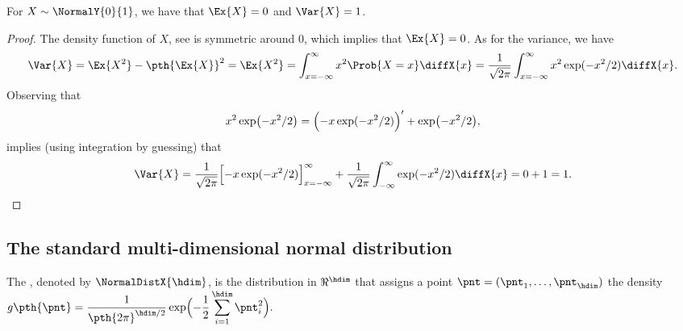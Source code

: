 \begin{lemma}
    For $X \sim \NormalY{0}{1}$, we have that $\Ex{X} = 0$ and
    $\Var{X} = 1$.
\end{lemma}
\begin{proof}
    The density function of $X$, see  is symmetric
    around $0$, which implies that $\Ex{X} =0$. As for the variance,
    we have
    \begin{equation*}
        \Var{X}%
        =%
        \Ex{X^2} - \pth{\Ex{X}}^2%
        =%
        \Ex{X^2}%
        =%
        \int_{x=-\infty}^\infty x^2 \Prob{X =x}
        \diffX{x}
        =
        \frac{1}{\sqrt{2\pi}}\int_{x=-\infty}^\infty x^2\exp(-x^2/2)
        \diffX{x}.        
    \end{equation*}
    Observing that
    \begin{equation*}
        x^2 \exp\bigl( -x^2/2 \bigr)%
        =%
        \Bigl( - x \exp(-x^2/2)\Bigr)'
        + \exp\bigl(-x^2/2\bigr), 
    \end{equation*}
    implies (using integration by guessing) that
    \begin{equation*}
        \Var{X} =
        \frac{1}{\sqrt{2\pi}}
        \Bigl[ -x \exp(-x^2/2) \Bigr]_{x=-\infty}^{\infty} +
        \frac{1}{\sqrt{2\pi}}
        \int_{-\infty}^\infty \exp(-x^2/2) \diffX{x} %
        =%
        0+1
        =%
        1.
    \end{equation*}
\end{proof}


\subsection{The standard multi-dimensional normal %
   distribution}

The , denoted by
$\NormalDistX{\hdim}$, is the distribution in $\Re^\hdim$ that assigns
a point $\pnt = ( \pnt_1, \ldots, \pnt_\hdim)$ the density
    \begin{math}
        \displaystyle g \pth{\pnt}%
        =%
        \frac{1}{\pth{2\pi}^{\hdim/2} } \exp \Bigl( - \frac{1}{2}
        \sum_{i=1}^\hdim \pnt_i^2 \Bigr).
    \end{math}
%

